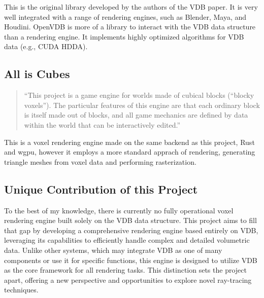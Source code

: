 This is the original library developed by the authors of the VDB paper. It is very well integrated with a range of rendering engines, such as Blender, Maya, and Houdini. OpenVDB is more of a library to interact with the VDB data structure than a rendering engine. It implements highly optimized algorithms for VDB data (e.g., CUDA HDDA).

\subsection{All is Cubes\supercite{cubes}}

\begin{quote}
``This project is a game engine for worlds made of cubical blocks (“blocky voxels”). The particular features of this engine are that each ordinary block is itself made out of blocks, and all game mechanics are defined by data within the world that can be interactively edited.''
\end{quote}

This is a voxel rendering engine made on the same backend as this project, Rust and wgpu, however it employs a more standard apprach of rendering, generating triangle meshes from voxel data and performing rasterization.

\subsection{ Unique Contribution of this Project}
To the best of my knowledge, there is currently no fully operational voxel rendering engine built solely on the VDB data structure. This project aims to fill that gap by developing a comprehensive rendering engine based entirely on VDB, leveraging its capabilities to efficiently handle complex and detailed volumetric data. Unlike other systems, which may integrate VDB as one of many components or use it for specific functions, this engine is designed to utilize VDB as the core framework for all rendering tasks. This distinction sets the project apart, offering a new perspective and opportunities to explore novel ray-tracing techniques.

